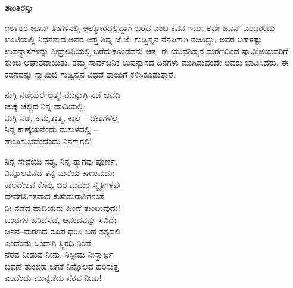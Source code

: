 \begin{myquote}
\end{myquote}

\selectkan

\begin{center}
\textbf{ಶಾಂತಿರಸ್ತು}
\end{center}

೧೮೯೮ರ ಜೂನ್ ತಿಂಗಳಿನಲ್ಲಿ ಆಲ್ಮೋರದಲ್ಲಿದ್ದಾಗ ಬರೆದ  ಎಂಬ ಕವನ ಇದು; ಅದೇ ಜೂನ್ ಎರಡರಂದು ಊಟಿಯಲ್ಲಿ ನಿಧನನಾದ ಅವರ ಆಪ್ತ ಶಿಷ್ಯ ಜೆ.ಜೆ. ಗುಡ್ವಿನ್ನನ ನೆನಪಿಗಾಗಿ ರಚಿಸಿದ್ದು. ಅವರ ಬಹಳಷ್ಟು ಉಪನ್ಯಾಸಗಳನ್ನು ಶೀಘ್ರಲಿಪಿಯಲ್ಲಿ ಬರೆದುಕೊಂಡವನು ಆತ. ಈ ಯುವಶಿಷ್ಯನ ಮರಣದಿಂದ ಸ್ವಾಮಿಜಿಯವರಿಗೆ ತುಂಬ ಆಘಾತವಾಯಿತು. ತಮ್ಮ ಸಾರ್ವಜನಿಕ ಉಪನ್ಯಾಸದ ದಿನಗಳು ಮುಗಿದುವಂದೇ ಅವರು ಭಾವಿಸಿದರು. ಈ ಕವನವನ್ನು ಸ್ವಾಮಿಜಿ ಗುಡ್ವಿನ್ನನ ವಿಧವೆ ತಾಯಿಗೆ ಕಳಿಸಿಕೊಡುತ್ತಾರೆ.

\begin{myquote}
ನುಗ್ಗಿ ನಡೆಯೆಲೆ ಆತ್ಮ! ಮುನ್ನುಗ್ಗಿ ನಡೆ ಜವದಿ\\ಚುಕ್ಕೆ ಚೆಲ್ಲಿದ ನಿನ್ನ ಹಾದಿಯಲ್ಲಿ;\\ನುಗ್ಗಿ ನಡೆ, ಅಮೃತಾತ್ಮ, ಕಾಲ – ದೇಶಗಳೆಲ್ಲ\\ನಿನ್ನ ಕಾಣ್ಕೆಯನೆಂದು ಮಸುಳದಲ್ಲಿ –\\ಶಾಂತಿಶುಭವೆಂದೆಂದು ನಿನಗಾಗಲಿ!
\end{myquote}

\begin{myquote}
ನಿನ್ನ ಸೇವೆಯು ಸತ್ಯ, ನಿನ್ನ ತ್ಯಾಗವು ಪೂರ್ಣ,\\ನಿನ್ನೊಲವಿನೆದೆ ತನ್ನ ಮನೆಯ ಕಾಣುವುದು;\\ಕಾಲದೇಶವ ಕೊಲ್ವ ಚಿರ ಮಧುರ ಸ್ಮೃತಿಗಳವು\\ದೇವಗರ್ಪಿತವಾದ ಕುಸುಮರಾಶಿಗಳಂತೆ\\ನೀ ನಡೆದ ಹಾದಿಯನು ಹಿಂದೆ ತುಂಬುವುದು!\\ಬಂಧಗಳ ಹರಿದೆಸೆದೆ, ಆನಂದವನ್ನು ಸವಿದೆ;\\ಜನನ–ಮರಣದ ರೂಪ ಧರಿಸಿ ಬಹ ಸತ್ಯದಲಿ\\ಎಂದೆಂದು ಒಂದಾಗಿ ಸ್ಥಿರದಿ ನಿಂದೆ;\\ನೆರವ ನೀಡುವ ನೀನು, ನಿಸ್ಸೀಮ ನಿಃಸ್ವಾರ್ಥಿ\\ಬವಣೆ ತುಂಬಿಹ ಜಗಕೆ ನಿನ್ನೊಲವ ಹರಿಸುತ್ತ\\ಎಂದೆಂದು ಮುನ್ನಡೆದು ನೆರವ ನೀಡು!
\end{myquote}

\selecteng

